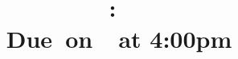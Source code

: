 \documentclass{article}
\title{
    \vspace{2in}
    \textmd{\textbf{\hmwkClass:\ \hmwkTitle}}\\
    \normalsize\vspace{0.1in}\small{Due\ on\ \hmwkDueDate\ at 4:00pm}\\
    \vspace{0.1in}\large{\textit{\hmwkClassInstructor}}
    \vspace{3in}
}
\author{\hmwkAuthorName \\ \hmwkAuthorEmail}
\date{}
\begin{document}
\maketitle

\pagebreak

% 


\pagebreak

% 


\pagebreak

% 


\pagebreak

% 


\pagebreak

% 


\pagebreak

% 

\end{document}
